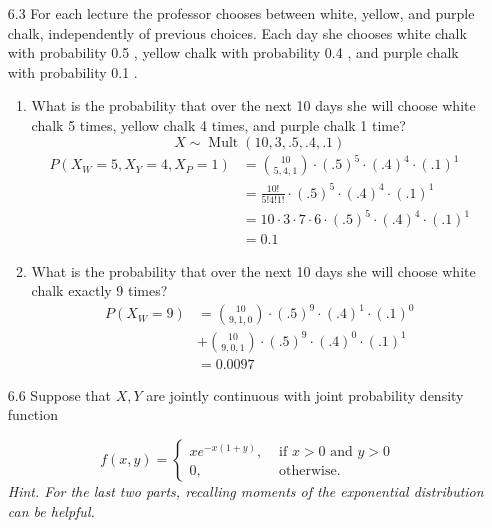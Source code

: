 \documentclass[10pt]{article}
\begin{document}
\begin{itemize}
\newpage
	\item[6.3] For each lecture the professor chooses between white, yellow, and purple chalk, independently of previous choices. Each day she chooses white chalk with probability 0.5 , yellow chalk with probability 0.4 , and purple chalk with probability 0.1 .

	\begin{enumerate}
		\item  What is the probability that over the next 10 days she will choose white chalk 5 times, yellow chalk 4 times, and purple chalk 1 time?
		\[ X \sim \operatorname{Mult}(10,3,.5,.4,.1)  \]
		\begin{align*}
			P(X_W=5, X_Y=4, X_P = 1) &= \binom{10}{5,4,1} \cdot \left(.5\right)^5 \cdot \left(.4\right)^4 \cdot \left(.1\right)^1 \\
			&= \frac{10!}{5!4!1!} \cdot \left(.5\right)^5 \cdot \left(.4\right)^4 \cdot \left(.1\right)^1 \\
			&= 10 \cdot 3 \cdot 7 \cdot 6 \cdot \left(.5\right)^5 \cdot \left(.4\right)^4 \cdot \left(.1\right)^1 \\
			&= 0.1
		\end{align*}

		\item  What is the probability that over the next 10 days she will choose white chalk exactly 9 times?
			\begin{align*}
				P(X_W = 9) &= \binom{10}{9,1,0} \cdot \left( .5 \right)^9 \cdot \left( .4 \right)^1 \cdot \left(.1\right)^0 \\
				             &+ \binom{10}{9,0,1} \cdot \left(.5\right)^9 \cdot \left(.4\right)^0 \cdot \left(.1\right)^1 \\
							 &= 0.0097
			\end{align*}
	\end{enumerate}


\newpage
	\item[6.6] Suppose that $X, Y$ are jointly continuous with joint probability density function


\[
f(x, y)= \begin{cases}x e^{-x(1+y)}, & \text { if } x>0 \text { and } y>0 \\ 0, & \text { otherwise. }\end{cases}
\]
		\emph{Hint. For the last two parts, recalling moments of the exponential distribution can be helpful.}


\end{itemize}
\end{document}
